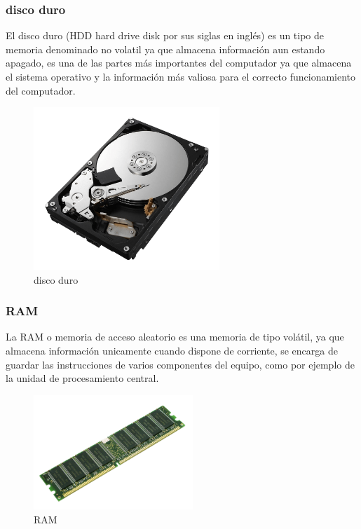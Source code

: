 \documentclass{article}
\begin{document}
\subsubsection{disco duro}
El disco duro (HDD hard drive disk por sus siglas en inglés) es un tipo de memoria denominado no volatil ya que almacena información aun estando apagado, es una de las partes más importantes del computador ya que almacena el sistema operativo y la información más valiosa para el correcto funcionamiento del computador.
\begin{figure}[h]
\includegraphics[width=7cm]{hdd.png}
\centering
\caption{disco duro}
\label{fig:HDD}
\end{figure}
\subsubsection{RAM}
La RAM o memoria de acceso aleatorio es una memoria de tipo volátil, ya que almacena información unicamente cuando dispone de corriente, se encarga de guardar las instrucciones de varios componentes del equipo, como por ejemplo de la unidad de procesamiento central.\cite{Edwin}
\begin{figure}[h]
\includegraphics[width=6cm]{RAM.png}
\centering
\caption{RAM}
\label{fig:RAM}
\end{figure}
\end{document}
